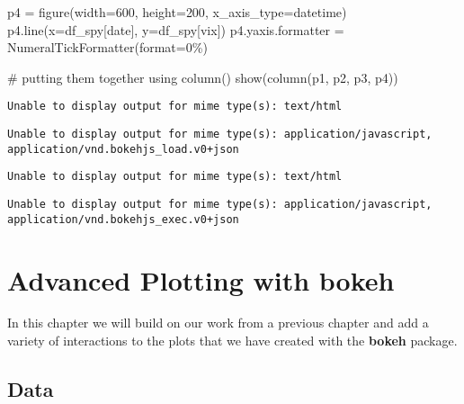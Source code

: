 \documentclass[
  letterpaper,
  DIV=11,
  numbers=noendperiod]{scrreprt}
\newenvironment{Shaded}{\begin{snugshade}}{\end{snugshade}}
\newcommand{\BuiltInTok}[1]{\textcolor[rgb]{0.00,0.23,0.31}{#1}}
\newcommand{\CommentTok}[1]{\textcolor[rgb]{0.37,0.37,0.37}{#1}}
\newcommand{\DecValTok}[1]{\textcolor[rgb]{0.68,0.00,0.00}{#1}}
\newcommand{\NormalTok}[1]{\textcolor[rgb]{0.00,0.23,0.31}{#1}}
\newcommand{\OperatorTok}[1]{\textcolor[rgb]{0.37,0.37,0.37}{#1}}
\newcommand{\StringTok}[1]{\textcolor[rgb]{0.13,0.47,0.30}{#1}}
\begin{document}
\begin{Shaded}
\begin{Highlighting}[]
\NormalTok{p4 }\OperatorTok{=}\NormalTok{ figure(width}\OperatorTok{=}\DecValTok{600}\NormalTok{, height}\OperatorTok{=}\DecValTok{200}\NormalTok{, x\_axis\_type}\OperatorTok{=}\StringTok{\textquotesingle{}datetime\textquotesingle{}}\NormalTok{)}
\NormalTok{p4.line(x}\OperatorTok{=}\NormalTok{df\_spy[}\StringTok{\textquotesingle{}date\textquotesingle{}}\NormalTok{], y}\OperatorTok{=}\NormalTok{df\_spy[}\StringTok{\textquotesingle{}vix\textquotesingle{}}\NormalTok{])}
\NormalTok{p4.yaxis.formatter }\OperatorTok{=}\NormalTok{ NumeralTickFormatter(}\BuiltInTok{format}\OperatorTok{=}\StringTok{\textquotesingle{}0\%\textquotesingle{}}\NormalTok{)}

\CommentTok{\# putting them together using column()}
\NormalTok{show(column(p1, p2, p3, p4))}
\end{Highlighting}
\end{Shaded}

\begin{verbatim}
Unable to display output for mime type(s): text/html
\end{verbatim}

\begin{verbatim}
Unable to display output for mime type(s): application/javascript, application/vnd.bokehjs_load.v0+json
\end{verbatim}

\begin{verbatim}
Unable to display output for mime type(s): text/html
\end{verbatim}

\begin{verbatim}
Unable to display output for mime type(s): application/javascript, application/vnd.bokehjs_exec.v0+json
\end{verbatim}

\hypertarget{advanced-plotting-with-bokeh}{%
\chapter{\texorpdfstring{Advanced Plotting with
\textbf{bokeh}}{Advanced Plotting with bokeh}}\label{advanced-plotting-with-bokeh}}

In this chapter we will build on our work from a previous chapter and
add a variety of interactions to the plots that we have created with the
\textbf{bokeh} package.

\hypertarget{data-1}{%
\section{Data}\label{data-1}}
\end{document}
